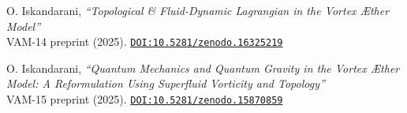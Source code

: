 \documentclass[twocolumn,aps,pre,floatfix,nofootinbib]{revtex4-2}
\begin{document}
\begin{thebibliography}{99}
    \label{VAM-14}
    O. Iskandarani,
    \emph{“Topological \& Fluid-Dynamic Lagrangian in the Vortex Æther Model”}\\
    {\scriptsize VAM-14 preprint (2025).
    \href{https://doi.org/10.5281/zenodo.16325219}{\texttt{DOI:10.5281/zenodo.16325219}}}

    \label{VAM-15}
    O. Iskandarani,
    \emph{“Quantum Mechanics and Quantum Gravity in the Vortex Æther Model: A Reformulation Using Superfluid Vorticity and Topology”}\\
    {\scriptsize VAM-15 preprint (2025).
    \href{https://doi.org/10.5281/zenodo.15870859}{\texttt{DOI:10.5281/zenodo.15870859}}}







\end{thebibliography}
\end{document}
